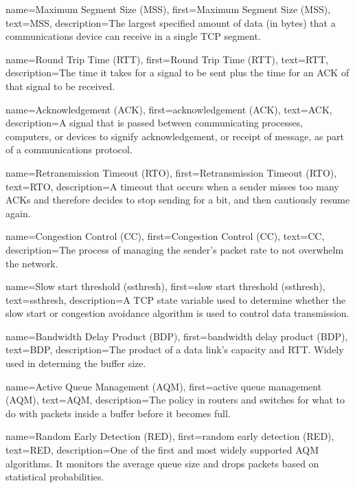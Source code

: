 {
    name={Maximum Segment Size (MSS)},
    first={Maximum Segment Size (MSS)},
    text={MSS},
    description={The largest specified amount of data (in bytes) that a communications device can receive in a single TCP segment.}
}

{
    name={Round Trip Time (RTT)},
    first={Round Trip Time (RTT)},
    text={RTT},
    description={The time it takes for a signal to be sent plus the time for an ACK of that signal to be received.}
}

{
    name={Acknowledgement (ACK)},
    first={acknowledgement (ACK)},
    text={ACK},
    description={A signal that is passed between communicating processes, computers, or devices to signify acknowledgement, or receipt of message, as part of a communications protocol.}
}

{
    name={Retransmission Timeout (RTO)},
    first={Retransmission Timeout (RTO)},
    text={RTO},
    description={A timeout that occurs when a sender misses too many ACKs and therefore decides to stop sending for a bit, and then cautiously resume again.}
}

{
    name={Congestion Control (CC)},
    first={Congestion Control (CC)},
    text={CC},
    description={The process of managing the sender's packet rate to not overwhelm the network.}
}

{
    name={Slow start threshold (ssthresh)},
    first={slow start threshold (ssthresh)},
    text={ssthresh},
    description={A TCP state variable used to determine whether the slow start or congestion avoidance algorithm is used to control data transmission.}
}

{
    name={Bandwidth Delay Product (BDP)},
    first={bandwidth delay product (BDP)},
    text={BDP},
    description={The product of a data link's capacity and RTT. Widely used in determing the buffer size.}
}

{
    name={Active Queue Management (AQM)},
    first={active queue management (AQM)},
    text={AQM},
    description={The policy in routers and switches for what to do with packets inside a buffer before it becomes full.}
}

{
    name={Random Early Detection (RED)},
    first={random early detection (RED)},
    text={RED},
    description={One of the first and most widely supported AQM algorithms. It monitors the average queue size and drops packets based on statistical probabilities.}
}

